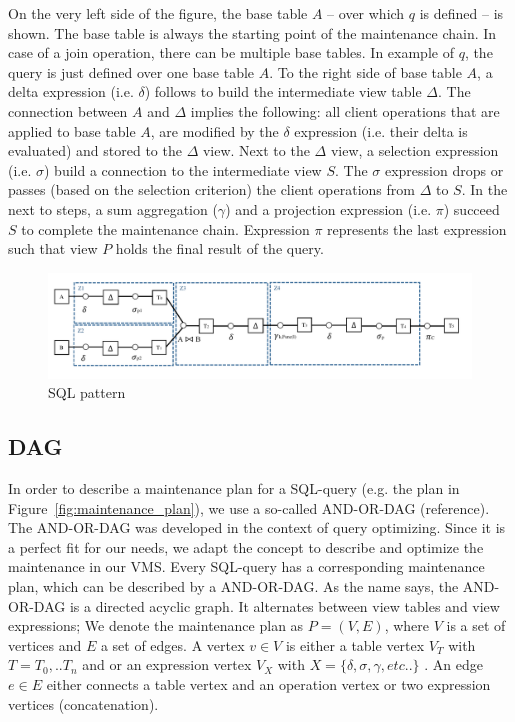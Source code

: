 On the very left side of the figure, the base table $A$ -- over which 
$q$ is defined -- is shown. The base table is always the starting point 
of the maintenance chain. In case of a join operation, there can be 
multiple base tables. In example of $q$, the query is just defined over 
one base table $A$. To the right side of base table $A$, a delta 
expression (i.e. $\delta$) follows to build the intermediate view table 
$\Delta$. The connection between $A$ and $\Delta$ implies the following: 
all client operations that are applied to base table $A$, are modified 
by the $\delta$ expression (i.e. their delta is evaluated) and stored to 
the $\Delta$ view. Next to the $\Delta$ view, a selection expression 
(i.e. $\sigma$) build a connection to the intermediate view $S$. The 
$\sigma$ expression drops or passes (based on the selection criterion) 
the client operations from $\Delta$ to $S$. In the next to steps, a sum 
aggregation ($\gamma$) and a projection expression (i.e. $\pi$) succeed 
$S$ to complete the maintenance chain. Expression $\pi$ represents the 
last expression such that view $P$ holds the final result of the query. 




\begin{figure} \centering 
	\includegraphics[width=\linewidth]{figures/SQLPattern} 
	\caption{SQL pattern} \label{fig:sql_pattern} 
\end{figure} 





\subsection{DAG}

In order to describe a maintenance plan for a SQL-query (e.g. the plan 
in Figure~\ref{fig:maintenance_plan}), we use a so-called AND-OR-DAG 
(reference). The AND-OR-DAG was developed in the context of query 
optimizing. Since it is a perfect fit for our needs, we adapt the 
concept to describe and optimize the maintenance in our VMS. Every 
SQL-query has a corresponding maintenance plan, which can be described 
by a AND-OR-DAG. As the name says, the AND-OR-DAG is a directed acyclic 
graph. It alternates between view tables and view expressions; We denote 
the maintenance plan as $P=(V,E)$, where $V$ is a set of 
vertices and $E$ a set of edges. A vertex $v \in V$ is either a table 
vertex $V_T$ with $T=T_0,..T_n$ and or an expression vertex $V_X$ with 
$X=\{\delta, \sigma, \gamma, etc..\}$ . An edge $e \in E$ either 
connects a table vertex and an operation vertex or two expression 
vertices (concatenation). 


